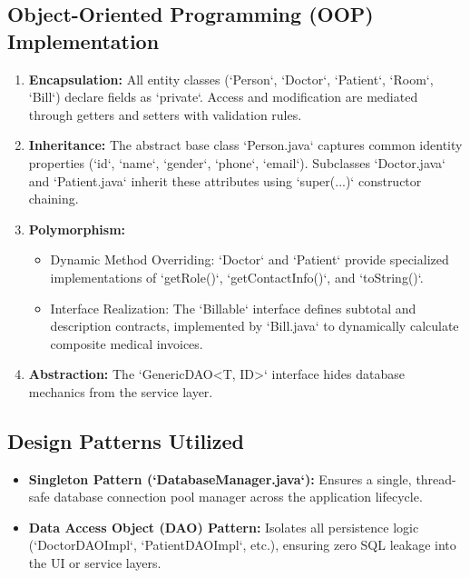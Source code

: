 \documentclass[12pt,a4paper]{article}
\begin{document}
\subsection{Object-Oriented Programming (OOP) Implementation}
\begin{enumerate}
    \item \textbf{Encapsulation:} All entity classes (`Person`, `Doctor`, `Patient`, `Room`, `Bill`) declare fields as `private`. Access and modification are mediated through getters and setters with validation rules.
    \item \textbf{Inheritance:} The abstract base class `Person.java` captures common identity properties (`id`, `name`, `gender`, `phone`, `email`). Subclasses `Doctor.java` and `Patient.java` inherit these attributes using `super(...)` constructor chaining.
    \item \textbf{Polymorphism:}
    \begin{itemize}[noitemsep]
        \item Dynamic Method Overriding: `Doctor` and `Patient` provide specialized implementations of `getRole()`, `getContactInfo()`, and `toString()`.
        \item Interface Realization: The `Billable` interface defines subtotal and description contracts, implemented by `Bill.java` to dynamically calculate composite medical invoices.
    \end{itemize}
    \item \textbf{Abstraction:} The `GenericDAO<T, ID>` interface hides database mechanics from the service layer.
\end{enumerate}

\subsection{Design Patterns Utilized}
\begin{itemize}[noitemsep]
    \item \textbf{Singleton Pattern (`DatabaseManager.java`):} Ensures a single, thread-safe database connection pool manager across the application lifecycle.
    \item \textbf{Data Access Object (DAO) Pattern:} Isolates all persistence logic (`DoctorDAOImpl`, `PatientDAOImpl`, etc.), ensuring zero SQL leakage into the UI or service layers.
\end{itemize}
\end{document}
